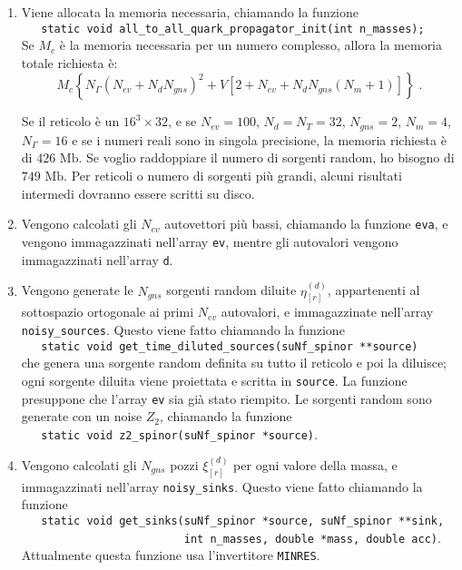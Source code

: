 \documentclass[a4paper]{article}
\newcommand{\point}{\; .}
\begin{document}
\begin{enumerate}

\item Viene allocata la memoria necessaria, chiamando la funzione\\
\verb|   static void all_to_all_quark_propagator_init(int n_masses);|\\
Se $M_c$ \`{e} la memoria necessaria per un numero complesso, allora la memoria totale richiesta \`{e}:
$$ M_c \left\{ N_{\Gamma} \left( N_{ev} +N_d N_{gns} \right)^2 + V \left[ 2+N_{ev}+N_d N_{gns} \left(N_m+1\right) \right] \right\} \point $$

Se il reticolo \`{e} un $ 16^3 \times 32 $, e se $N_{ev}=100$, $N_d=N_T=32$, $N_{gns}=2$, $N_m = 4$, $N_\Gamma = 16 $ e se i numeri reali sono in singola precisione, la memoria richiesta \`{e} di $426 \textrm{ Mb}$. Se voglio raddoppiare il numero di sorgenti random, ho bisogno di $749 \textrm{ Mb}$. Per reticoli o numero di sorgenti pi\`{u} grandi, alcuni risultati intermedi dovranno essere scritti su disco.

\item Vengono calcolati gli $N_{ev}$ autovettori pi\`{u} bassi, chiamando la funzione \verb|eva|, e vengono immagazzinati nell'array \verb|ev|, mentre gli autovalori vengono immagazzinati nell'array \verb|d|.

\item Vengono generate le $N_{gns}$ sorgenti random diluite $\eta_{[r]}^{(d)}$, appartenenti al sottospazio ortogonale ai primi $N_{ev}$ autovalori, e immagazzinate nell'array \verb|noisy_sources|. Questo viene fatto chiamando la funzione\\
\verb|   static void get_time_diluted_sources(suNf_spinor **source)|\\
che genera una sorgente random definita su tutto il reticolo e poi la diluisce; ogni sorgente diluita viene proiettata e scritta in \verb|source|. La funzione presuppone che l'array \verb|ev| sia gi\`{a} stato riempito. Le sorgenti random sono generate con un noise $Z_2$, chiamando la funzione\\
\verb|   static void z2_spinor(suNf_spinor *source)|.

\item Vengono calcolati gli  $N_{gns}$ pozzi $\xi_{[r]}^{(d)}$ per ogni valore della massa, e immagazzinati nell'array \verb|noisy_sinks|. Questo viene fatto chiamando la funzione\\
\verb|   static void get_sinks(suNf_spinor *source, suNf_spinor **sink,|\\
\verb|                         int n_masses, double *mass, double acc)|.\\
Attualmente questa funzione usa l'invertitore \verb|MINRES|.


\end{enumerate}
\end{document}
